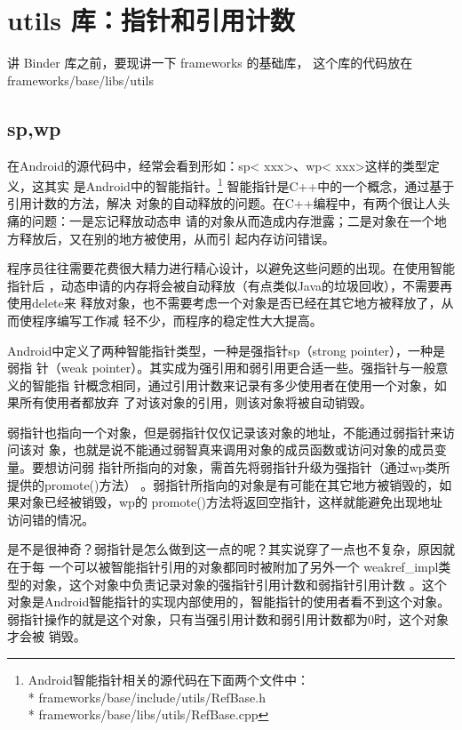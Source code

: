 \documentclass[a4paper,11pt]{article}
\begin{document}
\section{utils 库：指针和引用计数}
\iffalse
讲 Binder 库之前，要现讲一下 frameworks 的基础库， 这个库的代码放在 
frameworks/base/libs/utils
\subsection{sp,wp}

在Android的源代码中，经常会看到形如：sp< xxx>、wp< xxx>这样的类型定义，这其实
是Android中的智能指针。\footnote{
Android智能指针相关的源代码在下面两个文件中：\\*
frameworks/base/include/utils/RefBase.h\\*
frameworks/base/libs/utils/RefBase.cpp
}
智能指针是C++中的一个概念，通过基于引用计数的方法，解决
对象的自动释放的问题。在C++编程中，有两个很让人头痛的问题：一是忘记释放动态申
请的对象从而造成内存泄露；二是对象在一个地方释放后，又在别的地方被使用，从而引
起内存访问错误。

程序员往往需要花费很大精力进行精心设计，以避免这些问题的出现。在使用智能指针后
，动态申请的内存将会被自动释放（有点类似Java的垃圾回收），不需要再使用delete来
释放对象，也不需要考虑一个对象是否已经在其它地方被释放了，从而使程序编写工作减
轻不少，而程序的稳定性大大提高。


Android中定义了两种智能指针类型，一种是强指针sp（strong pointer），一种是弱指
针（weak pointer）。其实成为强引用和弱引用更合适一些。强指针与一般意义的智能指
针概念相同，通过引用计数来记录有多少使用者在使用一个对象，如果所有使用者都放弃
了对该对象的引用，则该对象将被自动销毁。

弱指针也指向一个对象，但是弱指针仅仅记录该对象的地址，不能通过弱指针来访问该对
象，也就是说不能通过弱智真来调用对象的成员函数或访问对象的成员变量。要想访问弱
指针所指向的对象，需首先将弱指针升级为强指针（通过wp类所提供的promote()方法）
。弱指针所指向的对象是有可能在其它地方被销毁的，如果对象已经被销毁，wp的
promote()方法将返回空指针，这样就能避免出现地址访问错的情况。

是不是很神奇？弱指针是怎么做到这一点的呢？其实说穿了一点也不复杂，原因就在于每
一个可以被智能指针引用的对象都同时被附加了另外一个
weakref_impl类型的对象，这个对象中负责记录对象的强指针引用计数和弱指针引用计数
。这个对象是Android智能指针的实现内部使用的，智能指针的使用者看不到这个对象。
弱指针操作的就是这个对象，只有当强引用计数和弱引用计数都为0时，这个对象才会被
销毁。
\end{document}

